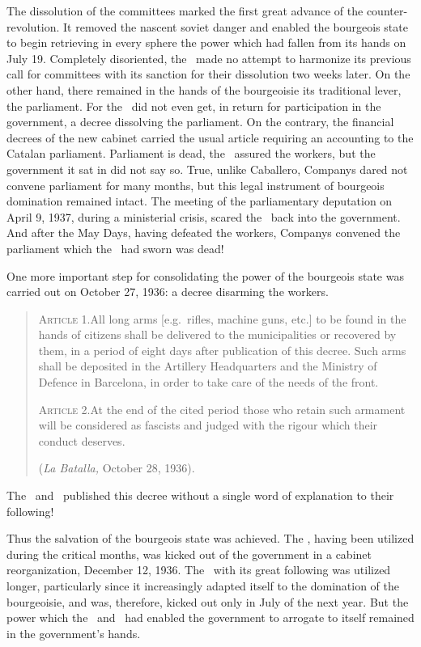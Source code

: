 The dissolution of the committees marked the first great advance of the counter-revolution. It removed the nascent soviet danger and enabled the bourgeois state to begin retrieving in every sphere the power which had fallen from its hands on July 19. Completely disoriented, the \POUM\ made no attempt to harmonize its previous call for committees with its sanction for their dissolution two weeks later. On the other hand, there remained in the hands of the bourgeoisie its traditional lever, the parliament. For the \POUM\ did not even get, in return for participation in the government, a decree dissolving the parliament. On the contrary, the financial decrees of the new cabinet carried the usual article requiring an accounting to the Catalan parliament. Parliament is dead, the \POUM\ assured the workers, but the government it sat in did not say so. True, unlike Caballero, Companys dared not convene parliament for many months, but this legal instrument of bourgeois domination remained intact. The meeting of the parliamentary deputation on April 9, 1937, during a ministerial crisis, scared the \CNT\ back into the government. And after the May Days, having defeated the workers, Companys convened the parliament which the \POUM\ had sworn was dead!

One more important step for consolidating the power of the bourgeois state was carried out on October 27, 1936: a decree disarming the workers.

\begin{quote}
  \textsc{\textsf{Article 1.}}\quad All long arms [e.g.\ rifles, machine guns, etc.] to be found in the hands of citizens shall be delivered to the municipalities or recovered by them, in a period of eight days after publication of this decree. Such arms shall be deposited in the Artillery Headquarters and the Ministry of Defence in Barcelona, in order to take care of the needs of the front.
  
  \textsc{\textsf{Article 2.}}\quad At the end of the cited period those who retain such armament will be considered as fascists and judged with the rigour which their conduct deserves.
  
  (\emph{La Batalla,} October 28, 1936).
\end{quote}

The \POUM\ and \CNT\ published this decree without a single word of explanation to their following!

Thus the salvation of the bourgeois state was achieved. The \POUM, having been utilized during the critical months, was kicked out of the government in a cabinet reorganization, December 12, 1936. The \CNT\ with its great following was utilized longer, particularly since it increasingly adapted itself to the domination of the bourgeoisie, and was, therefore, kicked out only in July of the next year. But the power which the \POUM\ and \CNT\ had enabled the government to arrogate to itself remained in the government’s hands.

